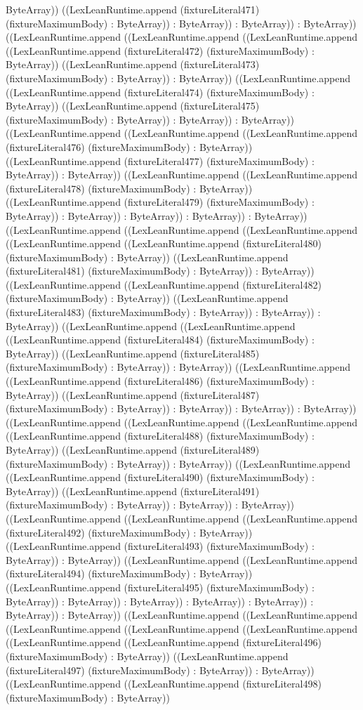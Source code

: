 \documentclass[11pt]{article}
\begin{document}
ByteArray)) ((LexLeanRuntime.append (fixtureLiteral471) (fixtureMaximumBody) : ByteArray)) : ByteArray)) : ByteArray)) : ByteArray)) ((LexLeanRuntime.append ((LexLeanRuntime.append ((LexLeanRuntime.append ((LexLeanRuntime.append (fixtureLiteral472) (fixtureMaximumBody) : ByteArray)) ((LexLeanRuntime.append (fixtureLiteral473) (fixtureMaximumBody) : ByteArray)) : ByteArray)) ((LexLeanRuntime.append ((LexLeanRuntime.append (fixtureLiteral474) (fixtureMaximumBody) : ByteArray)) ((LexLeanRuntime.append (fixtureLiteral475) (fixtureMaximumBody) : ByteArray)) : ByteArray)) : ByteArray)) ((LexLeanRuntime.append ((LexLeanRuntime.append ((LexLeanRuntime.append (fixtureLiteral476) (fixtureMaximumBody) : ByteArray)) ((LexLeanRuntime.append (fixtureLiteral477) (fixtureMaximumBody) : ByteArray)) : ByteArray)) ((LexLeanRuntime.append ((LexLeanRuntime.append (fixtureLiteral478) (fixtureMaximumBody) : ByteArray)) ((LexLeanRuntime.append (fixtureLiteral479) (fixtureMaximumBody) : ByteArray)) : ByteArray)) : ByteArray)) : ByteArray)) : ByteArray)) ((LexLeanRuntime.append ((LexLeanRuntime.append ((LexLeanRuntime.append ((LexLeanRuntime.append ((LexLeanRuntime.append (fixtureLiteral480) (fixtureMaximumBody) : ByteArray)) ((LexLeanRuntime.append (fixtureLiteral481) (fixtureMaximumBody) : ByteArray)) : ByteArray)) ((LexLeanRuntime.append ((LexLeanRuntime.append (fixtureLiteral482) (fixtureMaximumBody) : ByteArray)) ((LexLeanRuntime.append (fixtureLiteral483) (fixtureMaximumBody) : ByteArray)) : ByteArray)) : ByteArray)) ((LexLeanRuntime.append ((LexLeanRuntime.append ((LexLeanRuntime.append (fixtureLiteral484) (fixtureMaximumBody) : ByteArray)) ((LexLeanRuntime.append (fixtureLiteral485) (fixtureMaximumBody) : ByteArray)) : ByteArray)) ((LexLeanRuntime.append ((LexLeanRuntime.append (fixtureLiteral486) (fixtureMaximumBody) : ByteArray)) ((LexLeanRuntime.append (fixtureLiteral487) (fixtureMaximumBody) : ByteArray)) : ByteArray)) : ByteArray)) : ByteArray)) ((LexLeanRuntime.append ((LexLeanRuntime.append ((LexLeanRuntime.append ((LexLeanRuntime.append (fixtureLiteral488) (fixtureMaximumBody) : ByteArray)) ((LexLeanRuntime.append (fixtureLiteral489) (fixtureMaximumBody) : ByteArray)) : ByteArray)) ((LexLeanRuntime.append ((LexLeanRuntime.append (fixtureLiteral490) (fixtureMaximumBody) : ByteArray)) ((LexLeanRuntime.append (fixtureLiteral491) (fixtureMaximumBody) : ByteArray)) : ByteArray)) : ByteArray)) ((LexLeanRuntime.append ((LexLeanRuntime.append ((LexLeanRuntime.append (fixtureLiteral492) (fixtureMaximumBody) : ByteArray)) ((LexLeanRuntime.append (fixtureLiteral493) (fixtureMaximumBody) : ByteArray)) : ByteArray)) ((LexLeanRuntime.append ((LexLeanRuntime.append (fixtureLiteral494) (fixtureMaximumBody) : ByteArray)) ((LexLeanRuntime.append (fixtureLiteral495) (fixtureMaximumBody) : ByteArray)) : ByteArray)) : ByteArray)) : ByteArray)) : ByteArray)) : ByteArray)) : ByteArray)) ((LexLeanRuntime.append ((LexLeanRuntime.append ((LexLeanRuntime.append ((LexLeanRuntime.append ((LexLeanRuntime.append ((LexLeanRuntime.append ((LexLeanRuntime.append (fixtureLiteral496) (fixtureMaximumBody) : ByteArray)) ((LexLeanRuntime.append (fixtureLiteral497) (fixtureMaximumBody) : ByteArray)) : ByteArray)) ((LexLeanRuntime.append ((LexLeanRuntime.append (fixtureLiteral498) (fixtureMaximumBody) : ByteArray)) 
\end{document}
